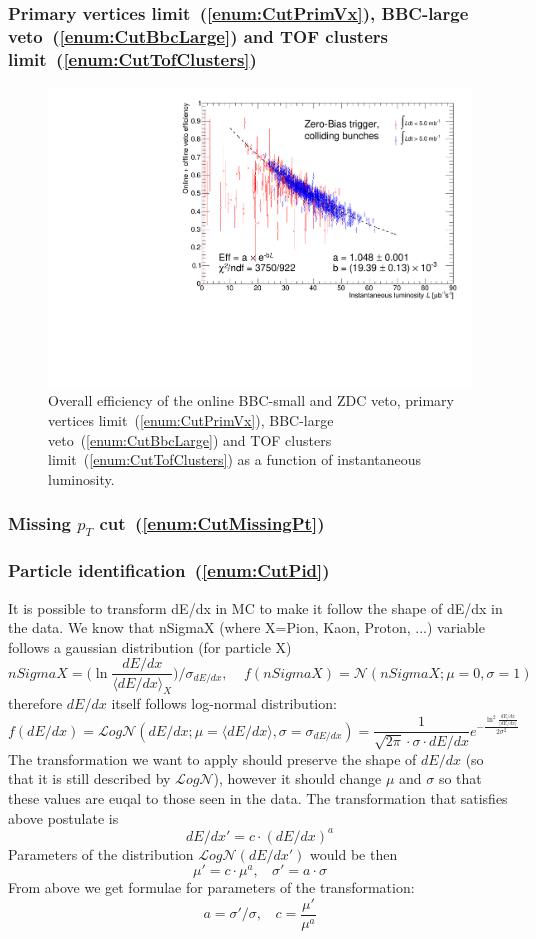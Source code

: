 \subsubsection{Primary vertices limit~(\ref{enum:CutPrimVx}), BBC-large veto~(\ref{enum:CutBbcLarge}) and TOF clusters limit~(\ref{enum:CutTofClusters})}
\begin{figure}[ht!]
\centering%
\includegraphics[width=0.65\linewidth,page=1]{graphics/corrections/OnlineAndOfflineVetoEffVsInstLumi_graph.pdf}%
\caption{Overall efficiency of the online BBC-small and ZDC veto, primary vertices limit~(\ref{enum:CutPrimVx}), BBC-large veto~(\ref{enum:CutBbcLarge}) and TOF clusters limit~(\ref{enum:CutTofClusters}) as a function of instantaneous luminosity.}\label{fig:onlineAndOfflineVetoEff}%
\end{figure}
\subsubsection{Missing \texorpdfstring{$p_{T}$}{pT} cut~(\ref{enum:CutMissingPt})}
\subsubsection{Particle identification~(\ref{enum:CutPid})}

It is possible to transform dE/dx in MC to make it follow the shape of dE/dx in the data. 
We know that nSigmaX (where X=Pion, Kaon, Proton, ...) variable follows a gaussian distribution (for particle X)
 \[nSigmaX = \Big( \ln{\frac{dE/dx}{\langle dE/dx\rangle_{X}}} \Big) / \sigma_{dE/dx},~~~~~f(nSigmaX) = \mathcal{N}(nSigmaX; \mu=0,\sigma=1)\]
therefore $dE/dx$ itself follows log-normal distribution:
\[f(dE/dx) = \mathcal{L}og\mathcal{N}(dE/dx; \mu=\langle dE/dx\rangle,\sigma=\sigma_{dE/dx}) = \frac{1}{\sqrt{2\pi}\cdot \sigma\cdot dE/dx}e^{-\frac{\ln^{2}{\frac{dE/dx}{\langle dE/dx\rangle}}}{2\sigma^{2}}}\]
The transformation we want to apply should preserve the shape of $dE/dx$ (so that it is still described by $\mathcal{L}og\mathcal{N}$), however it should change $\mu$ and $\sigma$ so that these values are euqal to those seen in the data. The transformation that satisfies above postulate is
\[dE/dx' = c\cdot (dE/dx)^{a}\]
Parameters of the distribution $\mathcal{L}og\mathcal{N}(dE/dx')$ would be then
\[\mu' = c\cdot\mu^{a},~~~~\sigma' = a\cdot\sigma\]
From above we get formulae for parameters of the transformation:
\[a=\sigma'/\sigma,~~~~c = \frac{\mu'}{\mu^{a}}\]


